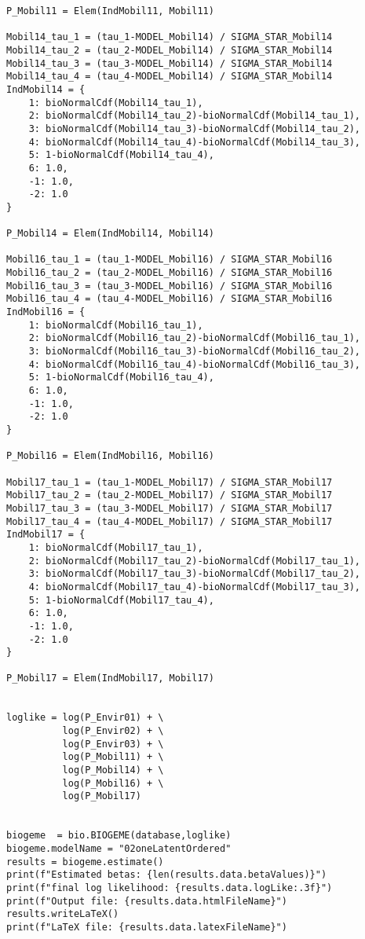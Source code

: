 \documentclass[12pt,a4paper]{article}
\begin{document}
\begin{lstlisting}[style=numbers]
P_Mobil11 = Elem(IndMobil11, Mobil11)

Mobil14_tau_1 = (tau_1-MODEL_Mobil14) / SIGMA_STAR_Mobil14
Mobil14_tau_2 = (tau_2-MODEL_Mobil14) / SIGMA_STAR_Mobil14
Mobil14_tau_3 = (tau_3-MODEL_Mobil14) / SIGMA_STAR_Mobil14
Mobil14_tau_4 = (tau_4-MODEL_Mobil14) / SIGMA_STAR_Mobil14
IndMobil14 = {
    1: bioNormalCdf(Mobil14_tau_1),
    2: bioNormalCdf(Mobil14_tau_2)-bioNormalCdf(Mobil14_tau_1),
    3: bioNormalCdf(Mobil14_tau_3)-bioNormalCdf(Mobil14_tau_2),
    4: bioNormalCdf(Mobil14_tau_4)-bioNormalCdf(Mobil14_tau_3),
    5: 1-bioNormalCdf(Mobil14_tau_4),
    6: 1.0,
    -1: 1.0,
    -2: 1.0
}

P_Mobil14 = Elem(IndMobil14, Mobil14)

Mobil16_tau_1 = (tau_1-MODEL_Mobil16) / SIGMA_STAR_Mobil16
Mobil16_tau_2 = (tau_2-MODEL_Mobil16) / SIGMA_STAR_Mobil16
Mobil16_tau_3 = (tau_3-MODEL_Mobil16) / SIGMA_STAR_Mobil16
Mobil16_tau_4 = (tau_4-MODEL_Mobil16) / SIGMA_STAR_Mobil16
IndMobil16 = {
    1: bioNormalCdf(Mobil16_tau_1),
    2: bioNormalCdf(Mobil16_tau_2)-bioNormalCdf(Mobil16_tau_1),
    3: bioNormalCdf(Mobil16_tau_3)-bioNormalCdf(Mobil16_tau_2),
    4: bioNormalCdf(Mobil16_tau_4)-bioNormalCdf(Mobil16_tau_3),
    5: 1-bioNormalCdf(Mobil16_tau_4),
    6: 1.0,
    -1: 1.0,
    -2: 1.0
}

P_Mobil16 = Elem(IndMobil16, Mobil16)

Mobil17_tau_1 = (tau_1-MODEL_Mobil17) / SIGMA_STAR_Mobil17
Mobil17_tau_2 = (tau_2-MODEL_Mobil17) / SIGMA_STAR_Mobil17
Mobil17_tau_3 = (tau_3-MODEL_Mobil17) / SIGMA_STAR_Mobil17
Mobil17_tau_4 = (tau_4-MODEL_Mobil17) / SIGMA_STAR_Mobil17
IndMobil17 = {
    1: bioNormalCdf(Mobil17_tau_1),
    2: bioNormalCdf(Mobil17_tau_2)-bioNormalCdf(Mobil17_tau_1),
    3: bioNormalCdf(Mobil17_tau_3)-bioNormalCdf(Mobil17_tau_2),
    4: bioNormalCdf(Mobil17_tau_4)-bioNormalCdf(Mobil17_tau_3),
    5: 1-bioNormalCdf(Mobil17_tau_4),
    6: 1.0,
    -1: 1.0,
    -2: 1.0
}

P_Mobil17 = Elem(IndMobil17, Mobil17)


loglike = log(P_Envir01) + \
          log(P_Envir02) + \
          log(P_Envir03) + \
          log(P_Mobil11) + \
          log(P_Mobil14) + \
          log(P_Mobil16) + \
          log(P_Mobil17)


biogeme  = bio.BIOGEME(database,loglike)
biogeme.modelName = "02oneLatentOrdered"
results = biogeme.estimate()
print(f"Estimated betas: {len(results.data.betaValues)}")
print(f"final log likelihood: {results.data.logLike:.3f}")
print(f"Output file: {results.data.htmlFileName}")
results.writeLaTeX()
print(f"LaTeX file: {results.data.latexFileName}")
\end{lstlisting}
\end{document}

